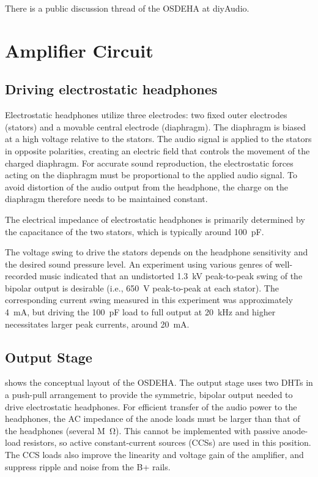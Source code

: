 There is a public discussion thread of the OSDEHA at diyAudio\cite{osdeha_p1}. 

\section{Amplifier Circuit}

\subsection{Driving electrostatic headphones} 

Electrostatic headphones utilize three electrodes: two fixed outer electrodes (stators) and a movable central electrode (diaphragm). The diaphragm is biased at a high voltage relative to the stators. The audio signal is applied to the stators in opposite polarities, creating an electric field that controls the movement of the charged diaphragm. For accurate sound reproduction, the electrostatic forces acting on the diaphragm must be proportional to the applied audio signal. To avoid distortion of the audio output from the headphone, the charge on the diaphragm therefore needs to be maintained constant.

The electrical impedance of electrostatic headphones is primarily determined by the capacitance of the two stators, which is typically around \SI{100}{pF}\cite{osdeha_p3}.

The voltage swing to drive the stators depends on the headphone sensitivity and the desired sound pressure level. An experiment using various genres of well-recorded music indicated that an undistorted \SI{1.3}{kV} peak-to-peak swing of the bipolar output is desirable (i.e., \SI{650}{V} peak-to-peak at each stator)\cite{osdeha_p8}. The corresponding current swing measured in this experiment was approximately \SI{4}{mA}, but driving the \SI{100}{pF} load to full output at \SI{20}{kHz} and higher necessitates larger peak currents, around \SI{20}{mA}\cite{osdeha_p2}.


\subsection{Output Stage}

 shows the conceptual layout of the OSDEHA. The output stage uses two DHTs in a push-pull arrangement to provide the symmetric, bipolar output needed to drive electrostatic headphones. For efficient transfer of the audio power to the headphones, the AC impedance of the anode loads must be larger than that of the headphones (several \unit{M\ohm}). This cannot be implemented with passive anode-load resistors, so active constant-current sources (CCSs) are used in this position. The CCS loads also improve the linearity and voltage gain of the amplifier, and suppress ripple and noise from the B+ rails.

